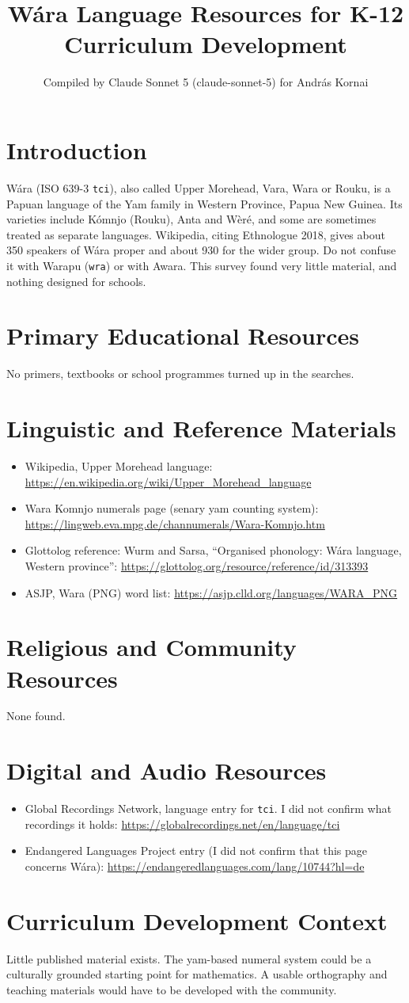 \documentclass[12pt]{article}
\title{W\'ara Language Resources for K-12 Curriculum Development}
\author{Compiled by Claude Sonnet 5 (claude-sonnet-5) for Andr\'as Kornai}
\date{}
\begin{document}
\maketitle

\section{Introduction}
W\'ara (ISO 639-3 \texttt{tci}), also called Upper Morehead, Vara, Wara or Rouku, is a Papuan language of the Yam family in Western Province, Papua New Guinea. Its varieties include K\'omnjo (Rouku), Anta and W\`er\'e, and some are sometimes treated as separate languages. Wikipedia, citing Ethnologue 2018, gives about 350 speakers of W\'ara proper and about 930 for the wider group. Do not confuse it with Warapu (\texttt{wra}) or with Awara. This survey found very little material, and nothing designed for schools.

\section{Primary Educational Resources}
No primers, textbooks or school programmes turned up in the searches.

\section{Linguistic and Reference Materials}
\begin{itemize}
\item Wikipedia, Upper Morehead language: \url{https://en.wikipedia.org/wiki/Upper_Morehead_language}
\item Wara Komnjo numerals page (senary yam counting system): \url{https://lingweb.eva.mpg.de/channumerals/Wara-Komnjo.htm}
\item Glottolog reference: Wurm and Sarsa, ``Organised phonology: W\'ara language, Western province'': \url{https://glottolog.org/resource/reference/id/313393}
\item ASJP, Wara (PNG) word list: \url{https://asjp.clld.org/languages/WARA_PNG}
\end{itemize}

\section{Religious and Community Resources}
None found.

\section{Digital and Audio Resources}
\begin{itemize}
\item Global Recordings Network, language entry for \texttt{tci}. I did not confirm what recordings it holds: \url{https://globalrecordings.net/en/language/tci}
\item Endangered Languages Project entry (I did not confirm that this page concerns W\'ara): \url{https://endangeredlanguages.com/lang/10744?hl=de}
\end{itemize}

\section{Curriculum Development Context}
Little published material exists. The yam-based numeral system could be a culturally grounded starting point for mathematics. A usable orthography and teaching materials would have to be developed with the community.
\end{document}
